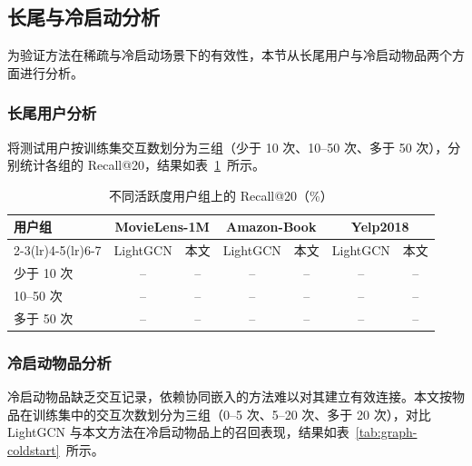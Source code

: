 
\subsection{长尾与冷启动分析}
\label{subsec:graph-longtail}

为验证方法在稀疏与冷启动场景下的有效性，本节从长尾用户与冷启动物品两个方面进行分析。

\subsubsection{长尾用户分析}
\label{subsubsec:graph-longtail}

将测试用户按训练集交互数划分为三组（少于 10 次、10--50 次、多于 50 次），分别统计各组的 Recall@20，结果如表~\ref{tab:graph-longtail}~所示。

\begin{table}[htbp]
  \centering
  \caption{不同活跃度用户组上的 Recall@20（\%）}
  \label{tab:graph-longtail}
  \begin{tabular}{lcccccc}
    \toprule
    \multirow{2}{*}{用户组} & \multicolumn{2}{c}{MovieLens-1M} & \multicolumn{2}{c}{Amazon-Book} & \multicolumn{2}{c}{Yelp2018} \\
    \cmidrule(lr){2-3}\cmidrule(lr){4-5}\cmidrule(lr){6-7}
     & LightGCN & 本文 & LightGCN & 本文 & LightGCN & 本文 \\
    \midrule
    少于 10 次   & -- & -- & -- & -- & -- & -- \\
    10--50 次    & -- & -- & -- & -- & -- & -- \\
    多于 50 次   & -- & -- & -- & -- & -- & -- \\
    \bottomrule
  \end{tabular}
\end{table}


\subsubsection{冷启动物品分析}
\label{subsubsec:graph-coldstart}

冷启动物品缺乏交互记录，依赖协同嵌入的方法难以对其建立有效连接。本文按物品在训练集中的交互次数划分为三组（0--5 次、5--20 次、多于 20 次），对比 LightGCN 与本文方法在冷启动物品上的召回表现，结果如表~\ref{tab:graph-coldstart}~所示。

